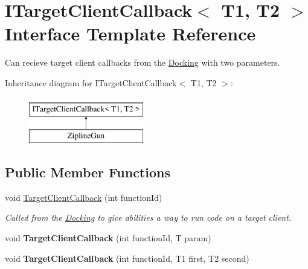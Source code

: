 \hypertarget{interface_i_target_client_callback}{}\section{I\+Target\+Client\+Callback$<$ T1, T2 $>$ Interface Template Reference}
\label{interface_i_target_client_callback}


Can recieve target client callbacks from the \hyperlink{class_docking}{Docking} with two parameters.  


Inheritance diagram for I\+Target\+Client\+Callback$<$ T1, T2 $>$\+:\begin{figure}[H]
\begin{center}
\leavevmode
\includegraphics[height=2.000000cm]{interface_i_target_client_callback}
\end{center}
\end{figure}
\subsection*{Public Member Functions}
\begin{DoxyCompactItemize}
\item 
void \hyperlink{interface_i_target_client_callback_aecebdc789897a595266e58e872fbb4c2}{Target\+Client\+Callback} (int function\+Id)
\begin{DoxyCompactList}\small\item\em Called from the \hyperlink{class_docking}{Docking} to give abilities a way to run code on a target client. \end{DoxyCompactList}\item 
\hypertarget{interface_i_target_client_callback_a489fa69f2087f585f87e0ffd76bddde5}{}\label{interface_i_target_client_callback_a489fa69f2087f585f87e0ffd76bddde5} 
void {\bfseries Target\+Client\+Callback} (int function\+Id, T param)
\item 
\hypertarget{interface_i_target_client_callback_a592a6b1f5b6cf9224e414f3b05459ef4}{}\label{interface_i_target_client_callback_a592a6b1f5b6cf9224e414f3b05459ef4} 
void {\bfseries Target\+Client\+Callback} (int function\+Id, T1 first, T2 second)
\end{DoxyCompactItemize}



